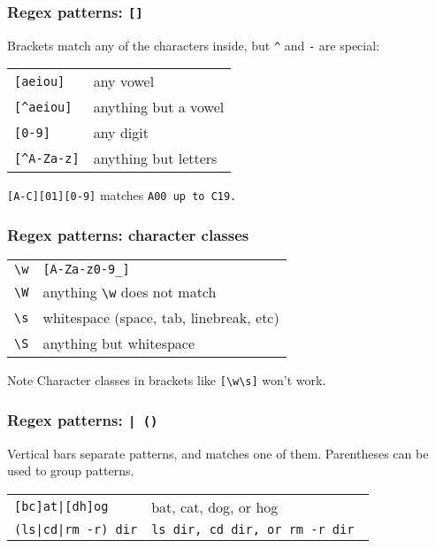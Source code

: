 \begin{frame}[fragile]
    \frametitle{Regex patterns: \tt{[]}}
    Brackets match any of the characters inside, but \verb|^| and \verb|-| are special:
    \begin{table}
        \centering
        \begin{tabular}{ll}
            \verb|[aeiou]|   & any vowel            \\
            \verb|[^aeiou]|  & anything but a vowel \\
            \verb|[0-9]|     & any digit            \\
            \verb|[^A-Za-z]| & anything but letters \\
        \end{tabular}
    \end{table}

    \begin{example}
        \verb|[A-C][01][0-9]| matches \tt{A00} up to \tt{C19}.
    \end{example}
\end{frame}

\begin{frame}[fragile]
    \frametitle{Regex patterns: character classes}
    \begin{table}
        \centering
        \begin{tabular}{ll}
            \verb|\w| & \verb|[A-Za-z0-9_]|                     \\
            \verb|\W| & anything \verb|\w| does not match       \\
            \verb|\s| & whitespace (space, tab, linebreak, etc) \\
            \verb|\S| & anything but whitespace                 \\
        \end{tabular}
    \end{table}

    \begin{block}{Note}
        Character classes in brackets like \verb|[\w\s]| won't work.
    \end{block}
\end{frame}

\begin{frame}[fragile]
    \frametitle{Regex patterns: \tt{| ()}}
    Vertical bars separate patterns, and matches one of them.
    Parentheses can be used to group patterns.
    \begin{table}
        \centering
        \begin{tabular}{ll}
            \verb![bc]at|[dh]og!     & bat, cat, dog, or hog                       \\
            \verb!(ls|cd|rm -r) dir! & \tt{ls dir}, \tt{cd dir}, or \tt{rm -r dir} \\
        \end{tabular}
    \end{table}
\end{frame}


